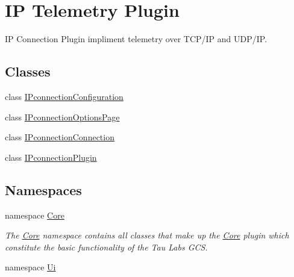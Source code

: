 \hypertarget{group___i_p_conn_plugin}{\section{\-I\-P \-Telemetry \-Plugin}
\label{group___i_p_conn_plugin}
}


\-I\-P \-Connection \-Plugin impliment telemetry over \-T\-C\-P/\-I\-P and \-U\-D\-P/\-I\-P.  


\subsection*{\-Classes}
\begin{DoxyCompactItemize}
\item 
class \hyperlink{class_i_pconnection_configuration}{\-I\-Pconnection\-Configuration}
\item 
class \hyperlink{class_i_pconnection_options_page}{\-I\-Pconnection\-Options\-Page}
\item 
class \hyperlink{class_i_pconnection_connection}{\-I\-Pconnection\-Connection}
\item 
class \hyperlink{class_i_pconnection_plugin}{\-I\-Pconnection\-Plugin}
\end{DoxyCompactItemize}
\subsection*{\-Namespaces}
\begin{DoxyCompactItemize}
\item 
namespace \hyperlink{namespace_core}{\-Core}
\begin{DoxyCompactList}\small\item\em \-The \hyperlink{namespace_core}{\-Core} namespace contains all classes that make up the \hyperlink{namespace_core}{\-Core} plugin which constitute the basic functionality of the \-Tau \-Labs \-G\-C\-S. \end{DoxyCompactList}\item 
namespace \hyperlink{namespace_ui}{\-Ui}
\end{DoxyCompactItemize}

